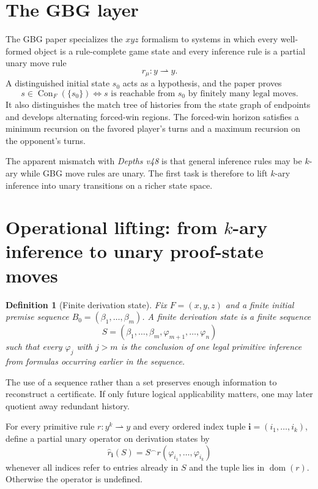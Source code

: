 \documentclass[11pt]{article}
\newtheorem{definition}{Definition}[section]
\theoremstyle{remark}
\newcommand{\Con}{\operatorname{Con}}
\newcommand{\dom}{\operatorname{dom}}
\begin{document}
\section{The GBG layer}

The GBG paper specializes the $xyz$ formalism to systems in which every well-formed object is a rule-complete game state and every inference rule is a partial unary move rule
\[
r_\mu:y\rightharpoonup y.
\]
A distinguished initial state $s_0$ acts as a hypothesis, and the paper proves
\[
s\in\Con_F(\{s_0\})
\iff
s\text{ is reachable from }s_0\text{ by finitely many legal moves}.
\]
It also distinguishes the match tree of histories from the state graph of endpoints and develops alternating forced-win regions. The forced-win horizon satisfies a minimum recursion on the favored player's turns and a maximum recursion on the opponent's turns.

The apparent mismatch with \emph{Depths v48} is that general inference rules may be $k$-ary while GBG move rules are unary. The first task is therefore to lift $k$-ary inference into unary transitions on a richer state space.

\section{Operational lifting: from \texorpdfstring{$k$}{k}-ary inference to unary proof-state moves}

\begin{definition}[Finite derivation state]
Fix $F=(x,y,z)$ and a finite initial premise sequence $B_0=(\beta_1,\ldots,\beta_m)$. A finite derivation state is a finite sequence
\[
S=(\beta_1,\ldots,\beta_m,\varphi_{m+1},\ldots,\varphi_n)
\]
such that every $\varphi_j$ with $j>m$ is the conclusion of one legal primitive inference from formulas occurring earlier in the sequence.
\end{definition}

The use of a sequence rather than a set preserves enough information to reconstruct a certificate. If only future logical applicability matters, one may later quotient away redundant history.

For every primitive rule $r:y^k\rightharpoonup y$ and every ordered index tuple $\mathbf i=(i_1,\ldots,i_k)$, define a partial unary operator on derivation states by
\[
\widehat r_{\mathbf i}(S)
=
S^\frown r(\varphi_{i_1},\ldots,\varphi_{i_k})
\]
whenever all indices refer to entries already in $S$ and the tuple lies in $\dom(r)$. Otherwise the operator is undefined.
\end{document}
